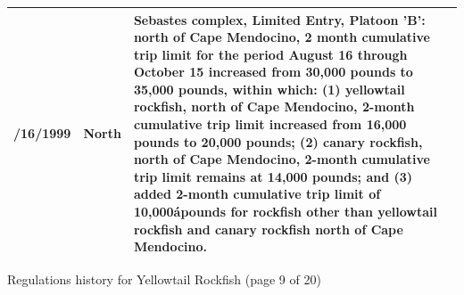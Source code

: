 \documentclass[12pt,]{article}
\begin{document}
\begin{tabular}{>{\centering}p{.60in}>{\centering}p{1.0in}>{\raggedright}p{4.20in}}
  8/16/1999 & 4030 North & Sebastes complex, Limited Entry, Platoon 'B': north of Cape Mendocino, 2 month cumulative trip limit for the period August 16  through October 15   increased from 30,000 pounds to 35,000 pounds, within which: (1) yellowtail rockfish, north of Cape Mendocino, 2-month cumulative trip limit increased from 16,000 pounds to 20,000 pounds; (2) canary rockfish, north of Cape Mendocino, 2-month cumulative trip limit remains at 14,000 pounds; and (3) added 2-month cumulative trip limit of 10,000ápounds for rockfish other than yellowtail rockfish and canary rockfish north of Cape Mendocino. \\ 
   \hline
\end{tabular}

\endgroup
\newpage
Regulations history for Yellowtail Rockfish (page 9 of 20)
\begingroup\fontsize{9pt}{10pt}\selectfont
\end{document}
